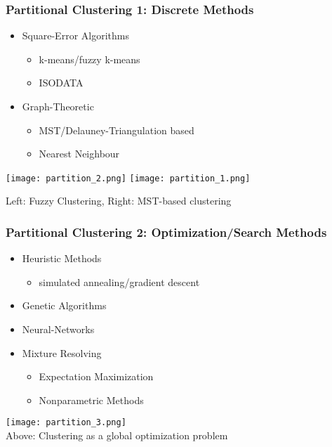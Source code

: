 \documentclass{beamer}
\begin{document}
        \frame
        {
            \frametitle{Partitional Clustering 1: Discrete Methods}
            \begin{itemize}
                \item Square-Error Algorithms
                    \begin{itemize}
                        \item k-means/fuzzy k-means
                        \item ISODATA
                    \end{itemize}
                \item Graph-Theoretic
                    \begin{itemize}
                        \item MST/Delauney-Triangulation based
                        \item Nearest Neighbour
                    \end{itemize}
            \end{itemize}

            \texttt{[image: partition\_2.png]}
            \texttt{[image: partition\_1.png]}
            \begin{center}
                {\sc Left:} Fuzzy Clustering, {\sc Right:} MST-based clustering
            \end{center}
        }

        \frame
        {
            \frametitle{Partitional Clustering 2: Optimization/Search Methods}
                \begin{itemize}
                    \item Heuristic Methods
                        \begin{itemize}
                            \item simulated annealing/gradient descent
                        \end{itemize}
                    \item Genetic Algorithms
                    \item Neural-Networks
                    \item Mixture Resolving
                        \begin{itemize}
                            \item Expectation Maximization
                            \item Nonparametric Methods
                        \end{itemize}
                \end{itemize}
                \begin{center}
                    \texttt{[image: partition\_3.png]}\\
                    {\sc Above:} Clustering as a global optimization problem
                \end{center}
        }
\end{document}
